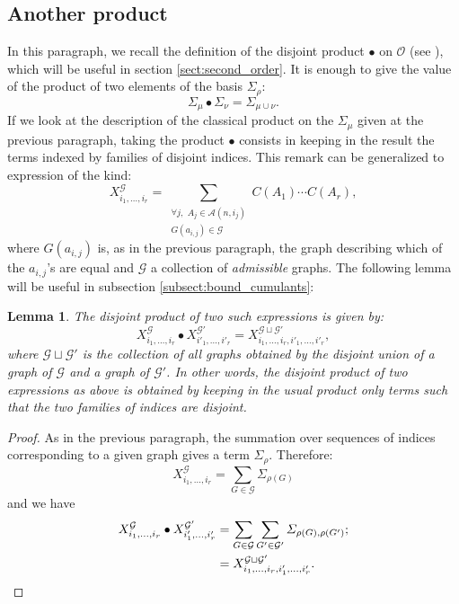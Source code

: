 \documentclass[10pt]{amsart}
\newtheorem{lemma}[theorem]{Lemma}
\theoremstyle{remark}
\newcommand{\Arr}{\mathcal{A}}
\newcommand{\obs}{\mathscr{O}}
\begin{document}
\subsection{Another product}\label{subsect:bullet_product}

In this paragraph, we recall the definition of the disjoint product $\bullet$ on $\obs$ (see \cite{Sniady06}), which will be useful in section \ref{sect:second_order}. It is enough to give the value of the product of two elements of the basis $\varSigma_\rho$:
$$\varSigma_\mu \bullet \varSigma_\nu = \varSigma_{\mu \cup \nu}.$$
If we look at the description of the classical product on the $\varSigma_\mu$ given at the previous paragraph, taking the product $\bullet$ consists in keeping in the result the terms indexed by families of disjoint indices. This remark can be generalized to expression of the kind:
$$X_{i_1,\dots,i_r}^{\mathcal{G}} = \sum_{ \substack{\forall j,\,\,A_j \in \Arr(n,i_j) \\  G(a_{i,j}) \in \mathcal{G}}} \!\!\!\!\!\!\!\! C(A_1) \cdots C(A_r),$$
where $G(a_{i,j})$ is, as in the previous paragraph, the graph describing which of the $a_{i,j}$'s are equal and $\mathcal{G}$ a collection of \emph{admissible} graphs. The following lemma will be useful in subsection \ref{subsect:bound_cumulants}:
\begin{lemma}\label{lem:bullet}
The disjoint product of two such expressions is given by:
$$X_{i_1,\dots,i_r}^{\mathcal{G}} \bullet X_{i'_1,\dots,i'_r}^{\mathcal{G}'} = X_{i_1,\dots,i_r,i'_1,\dots,i'_r}^{\mathcal{G} \sqcup \mathcal{G}'},$$
where $\mathcal{G} \sqcup \mathcal{G}'$ is the collection of all graphs obtained by the disjoint union of a graph of $\mathcal{G}$ and a graph of $\mathcal{G}'$.
In other words, the disjoint product of two expressions as above is obtained by keeping in the usual product only terms such that the two families of indices are disjoint.
\end{lemma}
\begin{proof}
As in the previous paragraph, the summation over sequences of indices corresponding to a given graph gives a term $\varSigma_\rho$. Therefore:
$$X_{i_1,\dots,i_r}^{\mathcal{G}} = \sum_{G \in \mathcal{G}} \varSigma_{\rho(G)}$$
and we have
\begin{align*}
X_{i_1,\dots,i_r}^{\mathcal{G}} \bullet X_{i'_1,\dots,i'_r}^{\mathcal{G}'} & = \sum_{G \in \mathcal{G}} \sum_{G' \in \mathcal{G}'} \varSigma_{\rho(G),\rho(G')};\\
&=X_{i_1,\dots,i_r,i'_1,\dots,i'_r}^{\mathcal{G} \sqcup \mathcal{G}'}.\qedhere
\end{align*}
\end{proof}\bigskip
\end{document}
